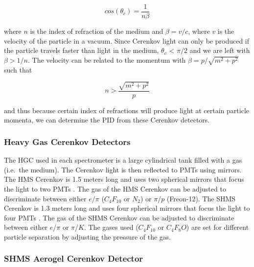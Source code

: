 \documentclass[
]{report}
\begin{document}
\begin{equation} 
cos(\theta_c) = \frac{1}{n\beta}
\label{eq:theta_cer} 
\end{equation}

where \(n\) is the index of refraction of the medium and \(\beta=v/c\),
where \(v\) is the velocity of the particle in a vacuum. Since Cerenkov
light can only be produced if the particle travels faster than light in
the medium, \(\theta_c\) \textless{} \(\pi/2\) and we are left with
\(\beta > 1/n\). The velocity can be related to the momentum with
\(\beta=p/\sqrt{m^2+p^2}\) such that

\begin{equation} 
n >\frac{\sqrt{m^2+p^2}}{p}
\label{eq:index_cer} 
\end{equation}

and thus because certain index of refractions will produce light at
certain particle momenta, we can determine the PID from these Cerenkov
detectors.

\hypertarget{heavy-gas-cerenkov-detectors}{%
\subsubsection{Heavy Gas Cerenkov
Detectors}\label{heavy-gas-cerenkov-detectors}}



The HGC used in each spectrometer is a large cylindrical tank filled
with a gas (i.e.~the medium). The Cerenkov light is then reflected to
PMTs using mirrors. The HMS Cerenkov is 1.5 meters long and uses two
spherical mirrors that focus the light to two PMTs
\cite{noauthor_threshold_1995}. The gas of the HMS Cerenkov can be
adjusted to discriminate between either \(e\)/\(\pi\) (\(C_4F_{10}\) or
\(N_2\)) or \(\pi\)/\(p\) (Freon-12). The SHMS Cerenkov is 1.3 meters
long and uses four spherical mirrors that focus the light to four PMTs
\cite{li_heavy_2012}. The gas of the SHMS Cerenkov can be adjusted to
discriminate between either \(e\)/\(\pi\) or \(\pi\)/\(K\). The gases
used (\(C_4F_{10}\) or \(C_4F_8O\)) are set for different particle
separation by adjusting the pressure of the gas.

\hypertarget{shms-aerogel-cerenkov-detector}{%
\subsubsection{SHMS Aerogel Cerenkov
Detector}\label{shms-aerogel-cerenkov-detector}}
\end{document}
